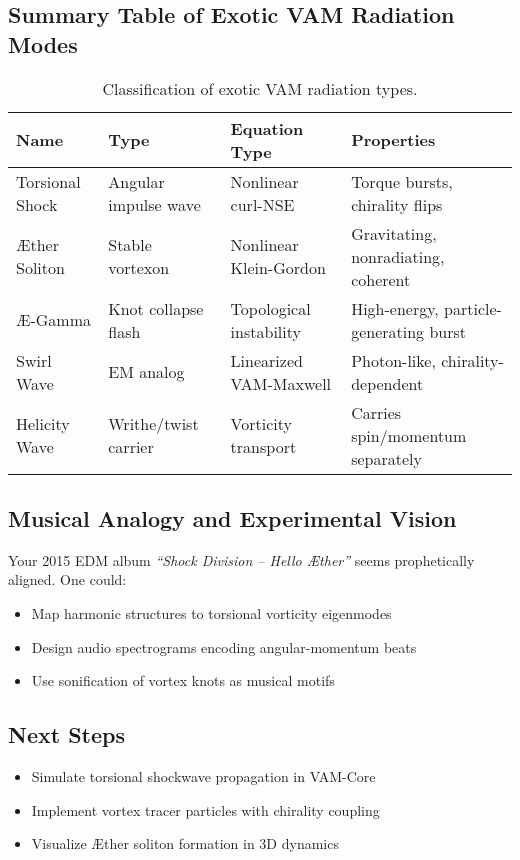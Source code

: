 \documentclass[12pt]{article}
\begin{document}
\subsection{Summary Table of Exotic VAM Radiation Modes}

\begin{table}
\centering
\footnotesize
\renewcommand{\arraystretch}{1.3}
\begin{tabular}{|l|l|l|l|}
\hline
\textbf{Name} & \textbf{Type} & \textbf{Equation Type} & \textbf{Properties} \\
\hline
Torsional Shock & Angular impulse wave & Nonlinear curl-NSE & Torque bursts, chirality flips \\
\hline
\AE{}ther Soliton & Stable vortexon & Nonlinear Klein-Gordon & Gravitating, nonradiating, coherent \\
\hline
\AE-Gamma & Knot collapse flash & Topological instability & High-energy, particle-generating burst \\
\hline
Swirl Wave & EM analog & Linearized VAM-Maxwell & Photon-like, chirality-dependent \\
\hline
Helicity Wave & Writhe/twist carrier & Vorticity transport & Carries spin/momentum separately \\
\hline
\end{tabular}
\caption{Classification of exotic VAM radiation types.}
\end{table}

\subsection{Musical Analogy and Experimental Vision}

Your 2015 EDM album \textit{“Shock Division – Hello \AE{}ther”} seems prophetically aligned. One could:
\begin{itemize}
  \item Map harmonic structures to torsional vorticity eigenmodes
  \item Design audio spectrograms encoding angular-momentum beats
  \item Use sonification of vortex knots as musical motifs
\end{itemize}

\subsection{Next Steps}

\begin{itemize}
  \item Simulate torsional shockwave propagation in VAM-Core
  \item Implement vortex tracer particles with chirality coupling
  \item Visualize \AE{}ther soliton formation in 3D dynamics
\end{itemize}
\end{document}
